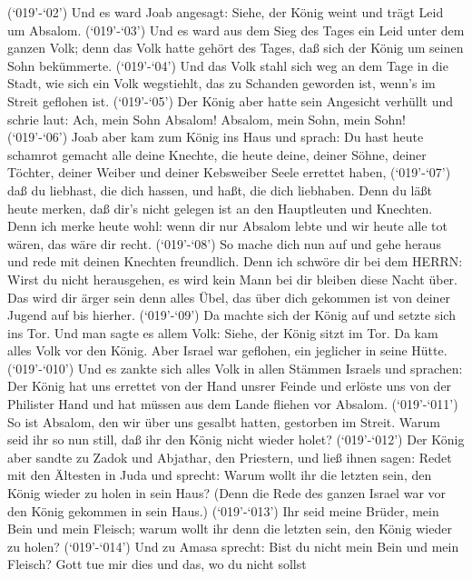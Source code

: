  (`019'-`02') Und es ward Joab angesagt: Siehe, der König
weint und trägt Leid um Absalom.  (`019'-`03') Und es ward
aus dem Sieg des Tages ein Leid unter dem ganzen Volk; denn das Volk
hatte gehört des Tages, daß sich der König um seinen Sohn bekümmerte.
 (`019'-`04') Und das Volk stahl sich weg an dem Tage in die
Stadt, wie sich ein Volk wegstiehlt, das zu Schanden geworden ist,
wenn's im Streit geflohen ist.  (`019'-`05') Der König aber
hatte sein Angesicht verhüllt und schrie laut: Ach, mein Sohn Absalom!
Absalom, mein Sohn, mein Sohn!  (`019'-`06') Joab aber kam
zum König ins Haus und sprach: Du hast heute schamrot gemacht alle deine
Knechte, die heute deine, deiner Söhne, deiner Töchter, deiner Weiber
und deiner Kebsweiber Seele errettet haben,  (`019'-`07')
daß du liebhast, die dich hassen, und haßt, die dich liebhaben. Denn du
läßt heute merken, daß dir's nicht gelegen ist an den Hauptleuten und
Knechten. Denn ich merke heute wohl: wenn dir nur Absalom lebte und wir
heute alle tot wären, das wäre dir recht.  (`019'-`08') So
mache dich nun auf und gehe heraus und rede mit deinen Knechten
freundlich. Denn ich schwöre dir bei dem HERRN: Wirst du nicht
herausgehen, es wird kein Mann bei dir bleiben diese Nacht über. Das
wird dir ärger sein denn alles Übel, das über dich gekommen ist von
deiner Jugend auf bis hierher.  (`019'-`09') Da machte sich
der König auf und setzte sich ins Tor. Und man sagte es allem Volk:
Siehe, der König sitzt im Tor. Da kam alles Volk vor den König. Aber
Israel war geflohen, ein jeglicher in seine Hütte. 
(`019'-`010') Und es zankte sich alles Volk in allen Stämmen Israels und
sprachen: Der König hat uns errettet von der Hand unsrer Feinde und
erlöste uns von der Philister Hand und hat müssen aus dem Lande fliehen
vor Absalom.  (`019'-`011') So ist Absalom, den wir über
uns gesalbt hatten, gestorben im Streit. Warum seid ihr so nun still,
daß ihr den König nicht wieder holet?  (`019'-`012') Der
König aber sandte zu Zadok und Abjathar, den Priestern, und ließ ihnen
sagen: Redet mit den Ältesten in Juda und sprecht: Warum wollt ihr die
letzten sein, den König wieder zu holen in sein Haus? (Denn die Rede des
ganzen Israel war vor den König gekommen in sein Haus.) 
(`019'-`013') Ihr seid meine Brüder, mein Bein und mein Fleisch; warum
wollt ihr denn die letzten sein, den König wieder zu holen?
 (`019'-`014') Und zu Amasa sprecht: Bist du nicht mein
Bein und mein Fleisch? Gott tue mir dies und das, wo du nicht sollst

